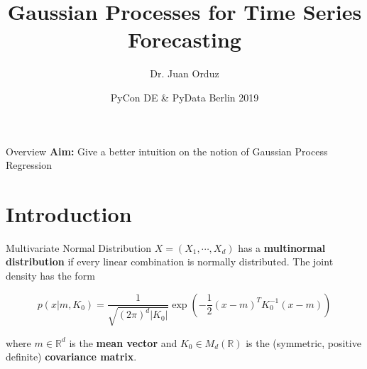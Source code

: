 \documentclass[10pt]{beamer}
\title[Gaussian Processes for Time Series Forecasting] %
{Gaussian Processes for Time Series Forecasting}
\author[Dr. Juan Orduz] %
{Dr. Juan Orduz}
\institute[PyCon DE \& PyData Berlin 2019] %
{

}
\date[ PyCon DE \& PyData Berlin 2019] %
{PyCon DE \& PyData Berlin 2019}
\begin{document}
\begin{frame}
  \titlepage
\end{frame}


\begin{frame}{Overview}
{{\bf Aim:} Give a better intuition on the notion of Gaussian Process Regression}
\tableofcontents
\end{frame}

\section{Introduction}

\begin{frame}{Multivariate Normal Distribution}{\cite{multivariate_normal_orduz_2019}}
$X = (X_1, \cdots, X_d)$ has a{ \bf multinormal distribution} if every linear combination is normally distributed. The joint density has the form

$$
p(x|m,K_0) =\frac{1}{\sqrt{(2\pi)^{d}|K_0|}}\exp\left(-\frac{1}{2}(x - m)^T K_0^{-1}(x - m)\right)
$$

where $m \in \mathbb{R}^d$ is the {\bf mean vector} and  $K_0 \in M_d(\mathbb{R})$ is the (symmetric, positive definite) {\bf covariance matrix}.


\end{frame}
\end{document}
